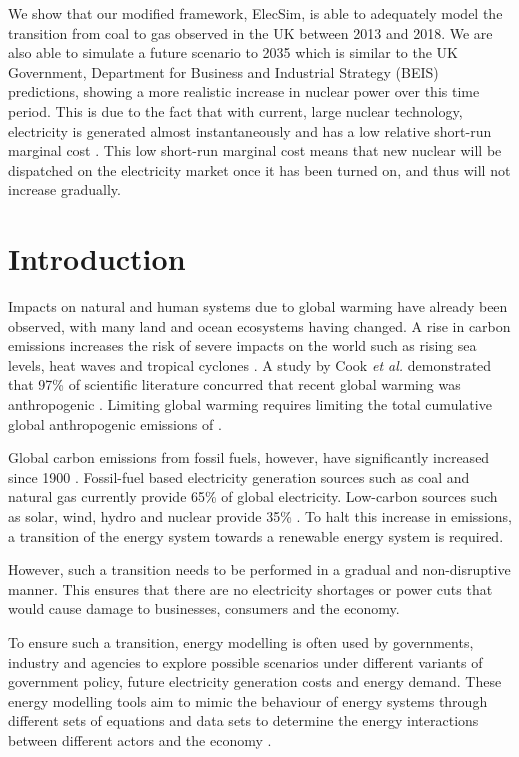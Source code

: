 

We show that our modified framework, ElecSim, is able to adequately model the transition from coal to gas observed in the UK between 2013 and 2018. We are also able to simulate a future scenario to 2035 which is similar to the UK Government, Department for Business and Industrial Strategy (BEIS) predictions, showing a more realistic increase in nuclear power over this time period. This is due to the fact that with current, large nuclear technology, electricity is generated almost instantaneously and has a low relative short-run marginal cost \cite{Department2016}. This low short-run marginal cost means that new nuclear will be dispatched on the electricity market once it has been turned on, and thus will not increase gradually.

\section{Introduction}


Impacts on natural and human systems due to global warming have already been observed, with many land and ocean ecosystems having changed. A rise in carbon emissions increases the risk of severe impacts on the world such as rising sea levels, heat waves and tropical cyclones \cite{Masson-Delmotte2018}. A study by Cook \textit{et al.} demonstrated that 97\% of scientific literature concurred that recent global warming was anthropogenic \cite{Cook2013}. Limiting global warming requires limiting the total cumulative global anthropogenic emissions of   \cite{Masson-Delmotte2018}. 

Global carbon emissions from fossil fuels, however, have significantly increased since 1900 \cite{boden2017global}.    Fossil-fuel based electricity generation sources such as coal and natural gas currently provide 65\% of global electricity. Low-carbon sources such as solar, wind, hydro and nuclear provide 35\% \cite{BP2018}. To halt this increase in  emissions, a transition of the energy system towards a renewable energy system is required. 

However, such a transition needs to be performed in a gradual and non-disruptive manner. This ensures that there are no electricity shortages or power cuts that would cause damage to businesses, consumers and the economy. 

To ensure such a transition, energy modelling is often used by governments, industry and agencies to explore possible scenarios under different variants of government policy, future electricity generation costs and energy demand. These energy modelling tools aim to mimic the behaviour of energy systems through different sets of equations and data sets to determine the energy interactions between different actors and the economy \cite{Machado2019}.

